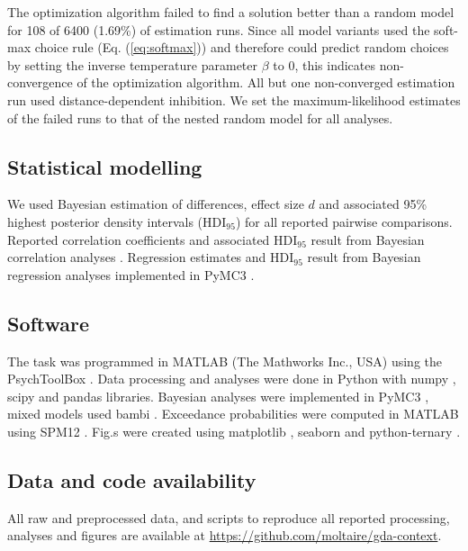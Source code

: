 \documentclass[11pt, a4paper]{article}
\begin{document}
The optimization algorithm failed to find a solution better than a random model for 108 of 6400 (1.69\%) of estimation runs. Since all model variants used the soft-max choice rule (Eq. (\ref{eq:softmax})) and therefore could predict random choices by setting the inverse temperature parameter $\beta$ to 0, this indicates non-convergence of the optimization algorithm. All but one non-converged estimation run used distance-dependent inhibition. We set the maximum-likelihood estimates of the failed runs to that of the nested random model for all analyses.

\subsection*{Statistical modelling}
We used Bayesian estimation \parencite[BEST;][]{kruschke2013BayesianEstimationSupersedes,kruschke2014DoingBayesianData} of differences, effect size $d$ and associated 95\% highest posterior density intervals (HDI$_{95}$) for all reported pairwise comparisons. Reported correlation coefficients and associated HDI$_{95}$ result from Bayesian correlation analyses \parencite{lee2013BayesianCognitiveModeling}. Regression estimates and HDI$_{95}$ result from Bayesian regression analyses implemented in PyMC3 \parencite{salvatier2016ProbabilisticProgrammingPython}.

\subsection*{Software}
The task was programmed in MATLAB (The Mathworks Inc., USA) using the PsychToolBox \parencite{brainard1997psychophysics}. Data processing and analyses were done in Python with numpy \parencite{harris2020array}, scipy \parencite{jones2001SciPyOpenSource} and pandas \parencite{mckinney2012PythonDataAnalysis} libraries. Bayesian analyses were implemented in PyMC3 \parencite{salvatier2016ProbabilisticProgrammingPython}, mixed models used bambi \parencite{yarkoni2016BambiSimpleInterface}. Exceedance probabilities were computed in MATLAB using SPM12 \parencite{penny2011statistical}. Fig.s were created using matplotlib \parencite{hunter2007Matplotlib2DGraphics}, seaborn \parencite{waskom2020seaborn} and python-ternary \parencite{pythonternary}.

\subsection*{Data and code availability}
All raw and preprocessed data, and scripts to reproduce all reported processing, analyses and figures are available at \hyperlink{https://github.com/moltaire/gda-context}{https://github.com/moltaire/gda-context}.
\end{document}
